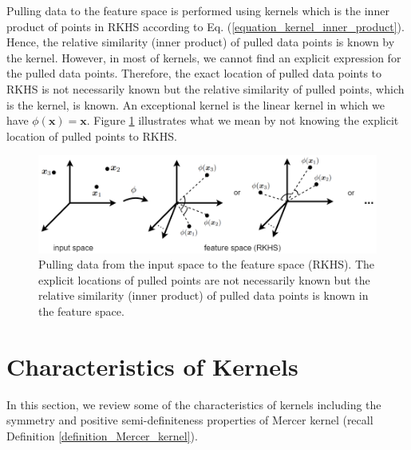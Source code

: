 \documentclass[lang=cn,10pt]{gorgeousnbook}
\numberwithin{equation}{section}%
\numberwithin{figure}{section}%
\begin{document}
Pulling data to the feature space is performed using kernels which is the inner product of points in RKHS according to Eq. (\ref{equation_kernel_inner_product}). Hence, the relative similarity (inner product) of pulled data points is known by the kernel. However, in most of kernels, we cannot find an explicit expression for the pulled data points. 
Therefore, the exact location of pulled data points to RKHS is not necessarily known but the relative similarity of pulled points, which is the kernel, is known. 
An exceptional kernel is the linear kernel in which we have $\phi(\boldsymbol{x}) = \boldsymbol{x}$. 
Figure \ref{figure_pulling} illustrates what we mean by not knowing the explicit location of pulled points to RKHS. 


\begin{figure}[!t]
\centering
\includegraphics[width=6in]{./images/pulling}
\caption{Pulling data from the input space to the feature space (RKHS). The explicit locations of pulled points are not necessarily known but the relative similarity (inner product) of pulled data points is known in the feature space.}
\label{figure_pulling}
\end{figure}

\section{Characteristics of Kernels}\label{section_kernel_characteristics}

In this section, we review some of the characteristics of kernels including the symmetry and positive semi-definiteness properties of Mercer kernel (recall Definition \ref{definition_Mercer_kernel}).
\end{document}
